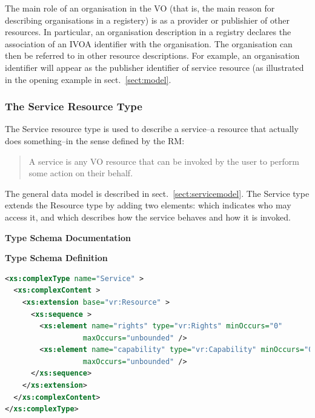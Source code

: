 \documentclass[11pt,a4paper]{ivoa}
\begin{document}
\endgroup

The main role of an organisation in the VO (that is, the main reason
for describing organisations in a registery) is as a provider or
publishier of other resources.  In particular, an organisation
description in a registry declares the association of an IVOA
identifier with the organisation.  The
organisation can then be referred to in other resource descriptions.
For example, an organisation identifier will appear as the publisher
identifier of service resource (as illustrated in the opening
example in sect.~\ref{sect:model}.


\subsubsection{The Service Resource Type}


The Service resource type is used to describe a service--a resource
that actually does something--in the sense defined by the
RM:

\begin{quotation}
A service is any VO resource that can be invoked by the user to
perform some action on their behalf.  
\end{quotation}


The general data model is described in sect.~\ref{sect:servicemodel}.
The Service type extends the Resource type by adding two elements:
 which indicates who may access it, and
 which describes how the service behaves and how it is
invoked.


\begingroup
      	\renewcommand*\descriptionlabel[1]{%
      	\hbox to 5.5em{\emph{#1}\hfil}}\vspace{2ex}\noindent\textbf{ Type Schema Documentation}


\vspace{1ex}\noindent\textbf{ Type Schema Definition}

\begin{lstlisting}[language=XML,basicstyle=\footnotesize]
<xs:complexType name="Service" >
  <xs:complexContent >
    <xs:extension base="vr:Resource" >
      <xs:sequence >
        <xs:element name="rights" type="vr:Rights" minOccurs="0"
                  maxOccurs="unbounded" />
        <xs:element name="capability" type="vr:Capability" minOccurs="0"
                  maxOccurs="unbounded" />
      </xs:sequence>
    </xs:extension>
  </xs:complexContent>
</xs:complexType>
\end{lstlisting}
\end{document}
